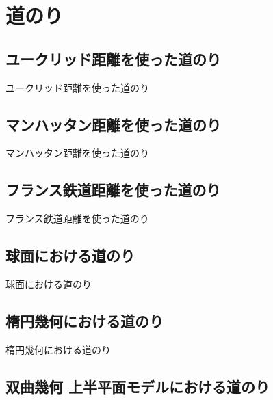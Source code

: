 \section{道のり}

\newpage

\subsection{ユークリッド距離を使った道のり}

ユークリッド距離を使った道のり

\newpage


\subsection{マンハッタン距離を使った道のり}

マンハッタン距離を使った道のり

\newpage


\subsection{フランス鉄道距離を使った道のり}

フランス鉄道距離を使った道のり

\newpage


\subsection{球面における道のり}

球面における道のり

\newpage


\subsection{楕円幾何における道のり}

楕円幾何における道のり

\newpage


\subsection{双曲幾何 上半平面モデルにおける道のり}

